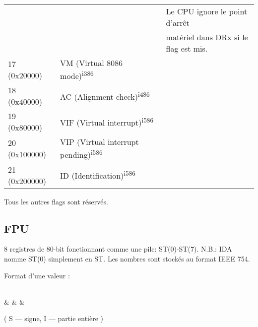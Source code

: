 \begin{center}
\begin{tabular}{ | l | l | l | }
             &                  & Le CPU ignore le point d'arrêt \\
	     &                  & matériel dans DRx si le flag est mis. \\
\hline
17 (0x20000) & VM (Virtual 8086 mode)\textsuperscript{i386} & \\
\hline
18 (0x40000) & AC (Alignment check)\textsuperscript{i486} & \\
\hline
19 (0x80000) & VIF (Virtual interrupt)\textsuperscript{i586} & \\
\hline
20 (0x100000) & VIP (Virtual interrupt pending)\textsuperscript{i586} & \\
\hline
21 (0x200000) & ID (Identification)\textsuperscript{i586} & \\
\hline
\end{tabular}
\end{center}
\normalsize

Tous les autres flags sont réservés.

\subsection{\registers{} FPU}

8 registres de 80-bit fonctionnant comme une pile: ST(0)-ST(7).
N.B.: \ac{IDA} nomme ST(0) simplement en ST.
Les nombres sont stockés au format IEEE 754.

Format d'une valeur :

\bigskip
\begin{center}
\begingroup
\makeatletter
\let\saved@bf@bitformatting\bf@bitformatting
\renewcommand*{\bf@bitformatting}{%
	\ifnum\value{header@val}=21 %
	\value{header@val}=62 %
	\else\ifnum\value{header@val}=22 %
	\value{header@val}=63 %
	\else\ifnum\value{header@val}=23 %
	\value{header@val}=64 %
	\else\ifnum\value{header@val}=30 %
	\value{header@val}=78 %
	\else\ifnum\value{header@val}=31 %
	\value{header@val}=79 %
	\fi\fi\fi\fi\fi
	\saved@bf@bitformatting
}%
\begin{bytefield}[bitwidth=0.03\linewidth]{32}
	 \\
	 &
	 &
	 &
\end{bytefield}
\endgroup
\end{center}

\begin{center}
( S --- signe, I --- partie entière )
\end{center}

